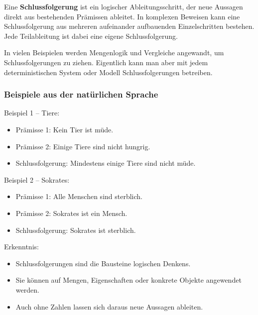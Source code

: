 \documentclass{article}
\begin{document}
      Eine \textbf{Schlussfolgerung} ist ein logischer Ableitungsschritt, der neue Aussagen direkt aus bestehenden Prämissen ableitet.  
      In komplexen Beweisen kann eine Schlussfolgerung aus mehreren aufeinander aufbauenden Einzelschritten bestehen. Jede Teilableitung ist dabei eine eigene Schlussfolgerung.
    


    

      In vielen Beispielen werden Mengenlogik und Vergleiche angewandt, um Schlussfolgerungen zu ziehen.  
      Eigentlich kann man aber mit jedem deterministischen System oder Modell Schlussfolgerungen betreiben.
    


    \subsubsection{Beispiele aus der natürlichen Sprache}
    
Beispiel 1 – Tiere:

    \begin{itemize}
      \item Prämisse 1: Kein Tier ist müde.

      \item Prämisse 2: Einige Tiere sind nicht hungrig.

      \item Schlussfolgerung: Mindestens einige Tiere sind nicht müde.

    \end{itemize}

    
Beispiel 2 – Sokrates:

    \begin{itemize}
      \item Prämisse 1: Alle Menschen sind sterblich.

      \item Prämisse 2: Sokrates ist ein Mensch.

      \item Schlussfolgerung: Sokrates ist sterblich.

    \end{itemize}

    
Erkenntnis:

    \begin{itemize}
      \item Schlussfolgerungen sind die Bausteine logischen Denkens.

      \item Sie können auf Mengen, Eigenschaften oder konkrete Objekte angewendet werden.

      \item Auch ohne Zahlen lassen sich daraus neue Aussagen ableiten.

    \end{itemize}
  
\end{document}
